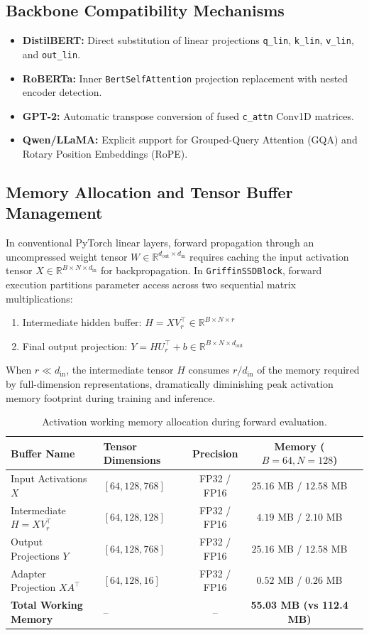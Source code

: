 \subsection{Backbone Compatibility Mechanisms}
\begin{itemize}
\item \textbf{DistilBERT:} Direct substitution of linear projections \texttt{q\_lin}, \texttt{k\_lin}, \texttt{v\_lin}, and \texttt{out\_lin}.
\item \textbf{RoBERTa:} Inner \texttt{BertSelfAttention} projection replacement with nested encoder detection.
\item \textbf{GPT-2:} Automatic transpose conversion of fused \texttt{c\_attn} Conv1D matrices.
\item \textbf{Qwen/LLaMA:} Explicit support for Grouped-Query Attention (GQA) and Rotary Position Embeddings (RoPE).
\end{itemize}

\subsection{Memory Allocation and Tensor Buffer Management}
In conventional PyTorch linear layers, forward propagation through an uncompressed weight tensor $W \in \mathbb{R}^{d_{\text{out}} \times d_{\text{in}}}$ requires caching the input activation tensor $X \in \mathbb{R}^{B \times N \times d_{\text{in}}}$ for backpropagation. In \texttt{GriffinSSDBlock}, forward execution partitions parameter access across two sequential matrix multiplications:
\begin{enumerate}
\item Intermediate hidden buffer: $H = X V_r^\top \in \mathbb{R}^{B \times N \times r}$
\item Final output projection: $Y = H U_r^\top + b \in \mathbb{R}^{B \times N \times d_{\text{out}}}$
\end{enumerate}
When $r \ll d_{\text{in}}$, the intermediate tensor $H$ consumes $r / d_{\text{in}}$ of the memory required by full-dimension representations, dramatically diminishing peak activation memory footprint during training and inference.

\begin{table}[H]
\centering
\small
\begin{tabular}{llccc}
\toprule
\textbf{Buffer Name} & \textbf{Tensor Dimensions} & \textbf{Precision} & \textbf{Memory ($B=64, N=128$)} \\
\midrule
Input Activations $X$ & $[64, 128, 768]$ & FP32 / FP16 & $25.16$ MB / $12.58$ MB \\
Intermediate $H = X V_r^\top$ & $[64, 128, 128]$ & FP32 / FP16 & $4.19$ MB / $2.10$ MB \\
Output Projections $Y$ & $[64, 128, 768]$ & FP32 / FP16 & $25.16$ MB / $12.58$ MB \\
Adapter Projection $X A^\top$ & $[64, 128, 16]$ & FP32 / FP16 & $0.52$ MB / $0.26$ MB \\
\midrule
\textbf{Total Working Memory} & -- & -- & \textbf{55.03 MB (vs 112.4 MB)} \\
\bottomrule
\end{tabular}
\caption{Activation working memory allocation during forward evaluation.}
\end{table}
